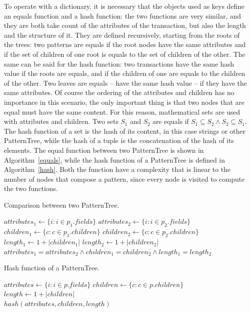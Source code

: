 \documentclass{acm_proc_article-sp-sigmod09}
\begin{document}
To operate with a dictionary, it is necessary that the objects used as keys define an equals function and a hash function: the two functions are very similar, and they are both take count of the attributes of the transaction, but also the length and the structure of it. They are defined recursively, starting from the roots of the trees: two patterns are equals if the root nodes have the same attributes and if the set of children of one root is equals to the set of children of the other. The same can be said for the hash function: two transactions have the same hash value if the roots are equals, and if the children of one are equals to the children of the other. Two leaves are equals -- have the same hash value -- if they have the same attributes. Of course the ordering of the attributes and children has no importance in this scenario, the only important thing is that two nodes that are equal must have the same content. For this reason, mathematical sets are used with attributes and children. Two sets $S_1$ and $S_2$ are equals if $S_1 \subseteq S_2 \land S_2 \subseteq S_1$. The hash function of a set is the hash of its content, in this case strings or other PatternTree, while the hash of a tuple is the concatenation of the hash of its elements. The equal function between two PatternTree is shown in Algorithm~\ref{equals}, while the hash function of a PatternTree is defined in Algorithm~\ref{hash}. Both the function have a complexity that is linear to the number of nodes that compose a pattern, since every node is visited to compute the two functions.

\begin{algorithm}
\caption{Comparison between two PatternTree.}
\label{equals}
\begin{algorithmic}[1]
\State $attributes_1 \gets \{i : i \in p_1.fields\}$
\State $attributes_2 \gets \{i : i \in p_2.fields\}$
\State $children_1 \gets \{c : c \in p_1.children\}$
\State $children_2 \gets \{c : c \in p_2.children\}$
\State $length_1 \gets 1 + |children_1|$
\State $length_2 \gets 1 + |children_2|$ \\
\Return $attributes_1 = attributes_2 \land children_1 = children_2 \land length_1 = length_2$
\EndFunction
\end{algorithmic}
\end{algorithm}

\begin{algorithm}
\caption{Hash function of a PatternTree.}
\label{hash}
\begin{algorithmic}[1]
\State $attributes \gets \{i : i \in p.fields\}$
\State $children \gets \{c : c \in p.children\}$
\State $length \gets 1 + |children|$ \\
\Return $hash(attributes, children, length)$
\EndFunction
\end{algorithmic}
\end{algorithm}
\end{document}
